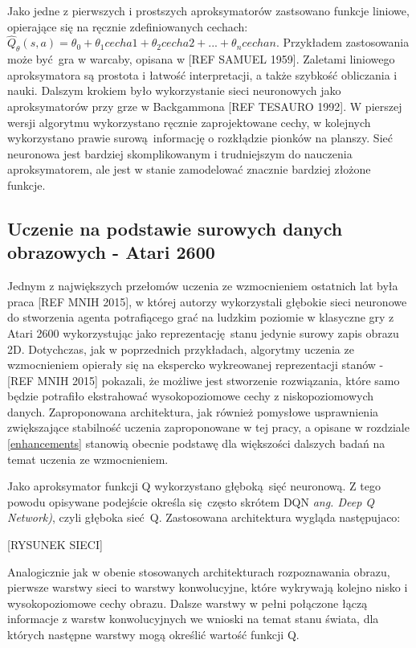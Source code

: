 Jako jedne z pierwszych i prostszych aproksymatorów zastsowano funkcje liniowe, opierające się na ręcznie zdefiniowanych cechach: $\hat{Q}_{\theta}(s,a) = \theta_0 + \theta_1cecha1 + \theta_2cecha2 + ... + \theta_ncechan$. Przykładem zastosowania może być gra w warcaby, opisana w [REF SAMUEL 1959]. Zaletami liniowego aproksymatora są prostota i łatwość interpretacji, a także szybkość obliczania i nauki. 
Dalszym krokiem było wykorzystanie sieci neuronowych jako aproksymatorów przy grze w Backgammona [REF TESAURO 1992]. W pierszej wersji algorytmu wykorzystano ręcznie zaprojektowane cechy, w kolejnych wykorzystano prawie surową informację o rozkłądzie pionków na planszy. Sieć neuronowa jest bardziej skomplikowanym i trudniejszym do nauczenia aproksymatorem, ale jest w stanie zamodelować znacznie bardziej złożone funkcje.

\subsection{Uczenie na podstawie surowych danych obrazowych - Atari 2600}

Jednym z największych przełomów uczenia ze wzmocnieniem ostatnich lat była praca [REF MNIH 2015], w której autorzy wykorzystali głębokie sieci neuronowe do stworzenia agenta potrafiącego grać na ludzkim poziomie w klasyczne gry z Atari 2600 wykorzystując jako reprezentację stanu jedynie surowy zapis obrazu 2D. Dotychczas, jak w poprzednich przykładach, algorytmy uczenia ze wzmocnieniem opierały się na ekspercko wykreowanej reprezentacji stanów - [REF MNIH 2015] pokazali, że możliwe jest stworzenie rozwiązania, które samo będzie potrafiło ekstrahować wysokopoziomowe cechy z niskopoziomowych danych. Zaproponowana architektura, jak również pomysłowe usprawnienia zwiększające stabilność uczenia zaproponowane w tej pracy, a opisane w rozdziale \ref {enhancements} stanowią obecnie podstawę dla większości dalszych badań na temat uczenia ze wzmocnieniem.

Jako aproksymator funkcji Q wykorzystano głęboką sięć neuronową. Z tego powodu opisywane podejście określa się często skrótem DQN \textit{ang. Deep Q Network)}, czyli głęboka sieć Q. Zastosowana architektura wygląda następujaco:

[RYSUNEK SIECI]

Analogicznie jak w obenie stosowanych architekturach rozpoznawania obrazu, pierwsze warstwy sieci to warstwy konwolucyjne, które wykrywają kolejno nisko i wysokopoziomowe cechy obrazu. Dalsze warstwy w pełni połączone łączą informacje z warstw konwolucyjnych we wnioski na temat stanu świata, dla których następne warstwy mogą określić wartość funkcji Q.


